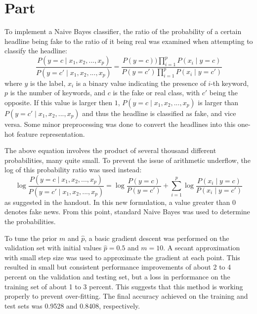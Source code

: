 \documentclass{article}
\newcommand{\enterproblemHeader}[1]{
}
\newcommand{\exitproblemHeader}[1]{
}
\newcounter{problem} %
\newcommand{\problemName}{}
\newenvironment{problem}[1][Part \theproblem]{ %
	\stepcounter{problem} %
	\renewcommand{\problemName}{#1} %
	\section{\problemName} %
	\enterproblemHeader{\problemName} %
}{
	\exitproblemHeader{\problemName} %
}
\begin{document}
\begin{problem}
	
	To implement a Naive Bayes classifier, the ratio of the probability of a certain headline being fake to the ratio of it being real was examined when attempting to classify the headline:
	\begin{equation*}
		\frac{P(y = c \mid x_1, x_2, ..., x_p)}{P(y = c' \mid x_1, x_2, ..., x_p)} = \frac{P(y = c))\prod_{i=1}^{p}P(x_i \mid y = c)}{P(y = c')\prod_{i=1}^{p}P(x_i \mid y = c')}
	\end{equation*}
	where \(y\) is the label, \(x_i\) is a binary value indicating the presence of \(i\)-th keyword, \(p\) is the number of keywords, and \(c\) is the fake or real class, with \(c'\) being the opposite. If this value is larger then \(1\), \(P(y = c \mid x_1, x_2, ..., x_p)\) is larger than \(P(y = c' \mid x_1, x_2, ..., x_p)\) and thus the headline is classified as fake, and vice versa. Some minor preprocessing was done to convert the headlines into this one-hot feature representation.
	
	The above equation involves the product of several thousand different probabilities, many quite small. To prevent the issue of arithmetic underflow, the log of this probability ratio was used instead:
	\begin{equation*}
		\log \frac{P(y = c \mid x_1, x_2, ..., x_p)}{P(y = c' \mid x_1, x_2, ..., x_p)} = \log \frac{P(y = c)}{P(y = c')} + \sum_{i=1}^{p} \log \frac{P(x_i \mid y = c)}{P(x_i \mid y = c')}
	\end{equation*}
	as suggested in the handout. In this new formulation, a value greater than 0 denotes fake news. From this point, standard Naive Bayes was used to determine the probabilities.
	
	To tune the prior \(m\) and \(\hat{p}\), a basic gradient descent was performed on the validation set with initial values \(\hat{p} = 0.5\) and \(m = 10\). A secant approximation with small step size was used to approximate the gradient at each point. This resulted in small but consistent performance improvements of about 2 to 4 percent on the validation and testing set, but a loss in performance on the training set of about 1 to 3 percent. This suggests that this method is working properly to prevent over-fitting. The final accuracy achieved on the training and test sets was 0.9528 and 0.8408, respectively.
	
\end{problem}
\clearpage

\end{document}
